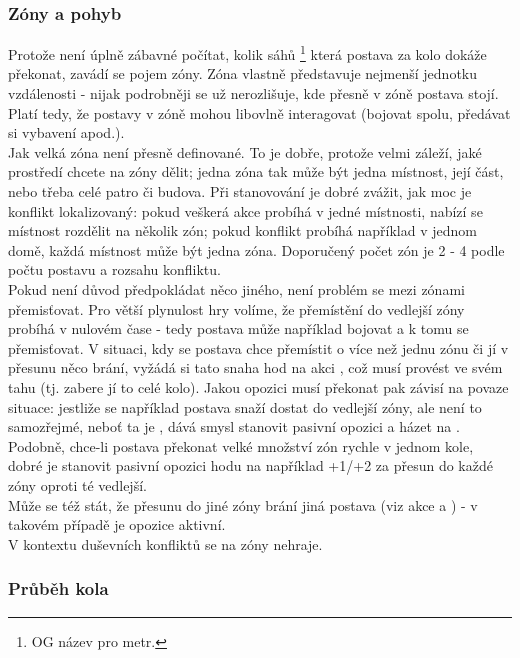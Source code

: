 \documentclass[../main.tex]{subfiles}
\begin{document}
\subsubsection{Zóny a pohyb}
\label{sec:zónyapohyb}

Protože není úplně zábavné počítat, kolik sáhů \footnote{OG název pro metr.} která postava za kolo dokáže překonat, zavádí se pojem zóny. Zóna vlastně představuje nejmenší jednotku vzdálenosti - nijak podrobněji se už nerozlišuje, kde přesně v zóně postava stojí. Platí tedy, že postavy v zóně mohou libovlně interagovat (bojovat spolu, předávat si vybavení apod.).\\
Jak velká zóna není přesně definované. To je dobře, protože velmi záleží, jaké prostředí chcete na zóny dělit; jedna zóna tak může být jedna místnost, její část, nebo třeba celé patro či budova. Při stanovování je dobré zvážit, jak moc je konflikt lokalizovaný: pokud veškerá akce probíhá v jedné místnosti, nabízí se místnost rozdělit na několik zón; pokud konflikt probíhá například v jednom domě, každá místnost může být jedna zóna. Doporučený počet zón je 2 - 4 podle počtu postavu a rozsahu konfliktu.\\
Pokud není důvod předpokládat něco jiného, není problém se mezi zónami přemisťovat. Pro větší plynulost hry volíme, že přemístění do vedlejší zóny probíhá v nulovém čase - tedy postava může například bojovat a k tomu se přemisťovat. V situaci, kdy se postava chce přemístit o více než jednu zónu či jí v přesunu něco brání, vyžádá si tato snaha hod na akci , což musí provést ve svém tahu (tj. zabere jí to celé kolo). Jakou opozici musí překonat pak závisí na povaze situace: jestliže se například postava snaží dostat do vedlejší zóny, ale není to samozřejmé, neboť ta je , dává smysl stanovit pasivní opozici a házet na . Podobně, chce-li postava překonat velké množství zón rychle v jednom kole, dobré je stanovit pasivní opozici hodu na například +1/+2 za přesun do každé zóny oproti té vedlejší.\\
Může se též stát, že přesunu do jiné zóny brání jiná postava (viz akce  a ) - v takovém případě je opozice aktivní.\\
V kontextu duševních konfliktů se na zóny nehraje.


\subsubsection{Průběh kola}
\label{sec:prubehkola}
\end{document}
